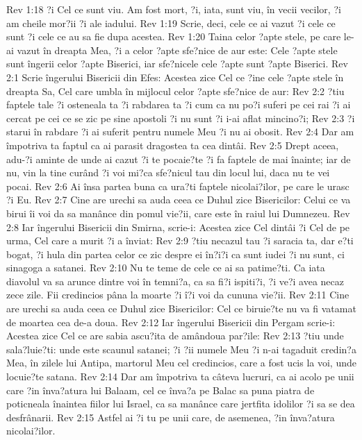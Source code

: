 Rev 1:18  ?i Cel ce sunt viu. Am fost mort, ?i, iata, sunt viu, în vecii vecilor, ?i am cheile mor?ii ?i ale iadului.
Rev 1:19  Scrie, deci, cele ce ai vazut ?i cele ce sunt ?i cele ce au sa fie dupa acestea.
Rev 1:20  Taina celor ?apte stele, pe care le-ai vazut în dreapta Mea, ?i a celor ?apte sfe?nice de aur este: Cele ?apte stele sunt îngerii celor ?apte Biserici, iar sfe?nicele cele ?apte sunt ?apte Biserici.
Rev 2:1  Scrie îngerului Bisericii din Efes: Acestea zice Cel ce ?ine cele ?apte stele în dreapta Sa, Cel care umbla în mijlocul celor ?apte sfe?nice de aur:
Rev 2:2  ?tiu faptele tale ?i osteneala ta ?i rabdarea ta ?i cum ca nu po?i suferi pe cei rai ?i ai cercat pe cei ce se zic pe sine apostoli ?i nu sunt ?i i-ai aflat mincino?i;
Rev 2:3  ?i starui în rabdare ?i ai suferit pentru numele Meu ?i nu ai obosit.
Rev 2:4  Dar am împotriva ta faptul ca ai parasit dragostea ta cea dintâi.
Rev 2:5  Drept aceea, adu-?i aminte de unde ai cazut ?i te pocaie?te ?i fa faptele de mai înainte; iar de nu, vin la tine curând ?i voi mi?ca sfe?nicul tau din locul lui, daca nu te vei pocai.
Rev 2:6  Ai însa partea buna ca ura?ti faptele nicolai?ilor, pe care le urasc ?i Eu.
Rev 2:7  Cine are urechi sa auda ceea ce Duhul zice Bisericilor: Celui ce va birui îi voi da sa manânce din pomul vie?ii, care este în raiul lui Dumnezeu.
Rev 2:8  Iar îngerului Bisericii din Smirna, scrie-i: Acestea zice Cel dintâi ?i Cel de pe urma, Cel care a murit ?i a înviat:
Rev 2:9  ?tiu necazul tau ?i saracia ta, dar e?ti bogat, ?i hula din partea celor ce zic despre ei în?i?i ca sunt iudei ?i nu sunt, ci sinagoga a satanei.
Rev 2:10  Nu te teme de cele ce ai sa patime?ti. Ca iata diavolul va sa arunce dintre voi în temni?a, ca sa fi?i ispiti?i, ?i ve?i avea necaz zece zile. Fii credincios pâna la moarte ?i î?i voi da cununa vie?ii.
Rev 2:11  Cine are urechi sa auda ceea ce Duhul zice Bisericilor: Cel ce biruie?te nu va fi vatamat de moartea cea de-a doua.
Rev 2:12  Iar îngerului Bisericii din Pergam scrie-i: Acestea zice Cel ce are sabia ascu?ita de amândoua par?ile:
Rev 2:13  ?tiu unde sala?luie?ti: unde este scaunul satanei; ?i ?ii numele Meu ?i n-ai tagaduit credin?a Mea, în zilele lui Antipa, martorul Meu cel credincios, care a fost ucis la voi, unde locuie?te satana.
Rev 2:14  Dar am împotriva ta câteva lucruri, ca ai acolo pe unii care ?in înva?atura lui Balaam, cel ce înva?a pe Balac sa puna piatra de poticneala înaintea fiilor lui Israel, ca sa manânce care jertfita idolilor ?i sa se dea desfrânarii.
Rev 2:15  Astfel ai ?i tu pe unii care, de asemenea, ?in înva?atura nicolai?ilor.
